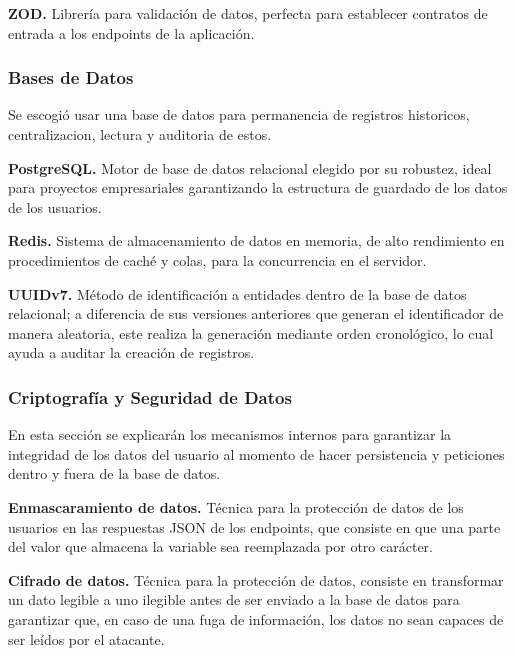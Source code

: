 \textbf{ZOD.} Librería para validación de datos, perfecta para establecer contratos de entrada a los endpoints de la aplicación.

\subsubsection{Bases de Datos}
Se escogió usar una base de datos para permanencia de registros historicos, centralizacion, lectura y auditoria de estos.

\textbf{PostgreSQL.} Motor de base de datos relacional elegido por su robustez, ideal para proyectos empresariales garantizando la estructura de guardado de los datos de los usuarios. \par

\textbf{Redis.} Sistema de almacenamiento de datos en memoria, de alto rendimiento en procedimientos de caché y colas, para la concurrencia en el servidor. \par

\textbf{UUIDv7.} Método de identificación a entidades dentro de la base de datos relacional; a diferencia de sus versiones anteriores que generan el identificador de manera aleatoria, este realiza la generación mediante orden cronológico, lo cual ayuda a auditar la creación de registros.

\subsubsection{Criptografía y Seguridad de Datos}
En esta sección se explicarán los mecanismos internos para garantizar la integridad de los datos del usuario al momento de hacer persistencia y peticiones dentro y fuera de la base de datos.

\textbf{Enmascaramiento de datos.} Técnica para la protección de datos de los usuarios en las respuestas JSON de los endpoints, que consiste en que una parte del valor que almacena la variable sea reemplazada por otro carácter. \par

\textbf{Cifrado de datos.} Técnica para la protección de datos, consiste en transformar un dato legible a uno ilegible antes de ser enviado a la base de datos para garantizar que, en caso de una fuga de información, los datos no sean capaces de ser leídos por el atacante.

